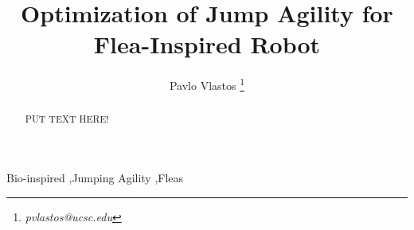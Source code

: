 \documentclass[preprint,authoryear,12pt] {elsarticle}
\begin{document}
\begin{frontmatter}
\title{Optimization of Jump Agility for Flea-Inspired Robot} 

\author{Pavlo Vlastos \footnote{\textit{pvlastos@ucsc.edu}}}

\address{Baskin School of Engineering, UC Santa Cruz}

%
%
\begin{abstract} 
PUT TEXT HERE!
\end{abstract}

\begin{keyword}
Bio-inspired \sep Jumping Agility \sep Fleas 
\end{keyword}

\end{frontmatter}




 	
 
 		
 	





\end{document}
